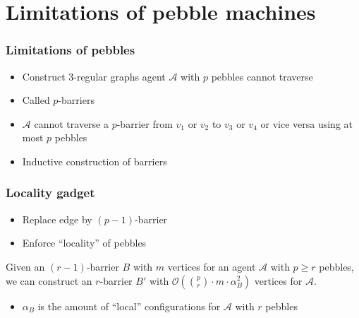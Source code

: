 \documentclass{beamer}
\begin{document}
\section{Limitations of pebble machines}
\begin{frame}
  \frametitle{Limitations of pebbles}
  \begin{itemize}
    \item Construct 3-regular graphs agent $\mathcal{A}$ with $p$ pebbles
      cannot traverse
    \item Called $p$-barriers
      \begin{center}
        \resizebox{0.6\textwidth}{!}{}
      \end{center}
    \item $\mathcal{A}$ cannot traverse a $p$-barrier from $v_{1}$ or $v_{2}$
      to $v_{3}$ or $v_{4}$ or vice versa using at most $p$ pebbles
    \item Inductive construction of barriers
  \end{itemize}
\end{frame}

\begin{frame}
  \frametitle{Locality gadget}
  \begin{itemize}
    \item Replace edge by $(p-1)$-barrier
    \item Enforce \enquote{locality} of pebbles
      \begin{center}
      \end{center}
  \end{itemize}
\end{frame}

\begin{frame}
  \begin{theorem}
    Given an $(r-1)$-barrier $B$ with $m$ vertices for an agent $\mathcal{A}$
    with $p\geq r$ pebbles, we can construct an $r$-barrier $B'$ with
    $\mathcal{O}(\binom{p}{r}\cdot m\cdot\alpha_{B}^{2})$ vertices for
    $\mathcal{A}$.
  \end{theorem}
  \begin{itemize}
    \item $\alpha_{B}$ is the amount of \enquote{local} configurations for
      $\mathcal{A}$ with $r$ pebbles
  \end{itemize}
\end{frame}
\end{document}
